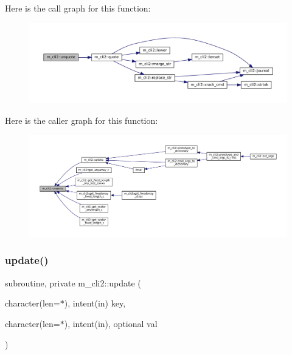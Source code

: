 Here is the call graph for this function\+:
\nopagebreak
\begin{figure}[H]
\begin{center}
\leavevmode
\includegraphics[width=350pt]{namespacem__cli2_a9cab7352414f8b5625330a9ff5cf0cb4_cgraph}
\end{center}
\end{figure}
Here is the caller graph for this function\+:
\nopagebreak
\begin{figure}[H]
\begin{center}
\leavevmode
\includegraphics[width=350pt]{namespacem__cli2_a9cab7352414f8b5625330a9ff5cf0cb4_icgraph}
\end{center}
\end{figure}
\mbox{\label{namespacem__cli2_a160d56bc4a10faef7e8a8a4f04f4dadb}} 
\subsubsection{\texorpdfstring{update()}{update()}}
{\footnotesize\ttfamily subroutine, private m\+\_\+cli2\+::update (\begin{DoxyParamCaption}\item[{character(len=$\ast$), intent(in)}]{key,  }\item[{character(len=$\ast$), intent(in), optional}]{val }\end{DoxyParamCaption})\hspace{0.3cm}{\ttfamily [private]}}



